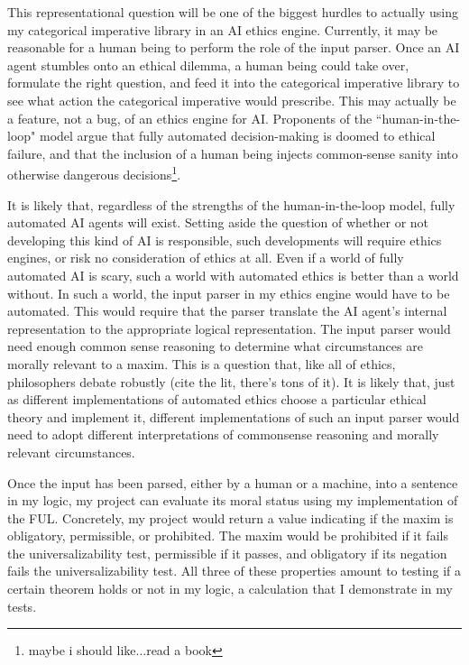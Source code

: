 \begin{isabellebody}
\begin{isamarkuptext}
This representational
question will be one of the biggest hurdles to actually using my categorical imperative library 
in an AI ethics engine. Currently, it may be reasonable for a human being to perform the role of the input
parser. Once an AI agent stumbles onto an ethical dilemma, a human being could take over, formulate 
the right question, and feed it into the categorical imperative library to see what action the categorical 
imperative would prescribe. This may actually be a feature, not a bug, of an ethics engine for AI. 
Proponents of the ``human-in-the-loop" model argue that fully automated decision-making is doomed 
to ethical failure, and that the inclusion of a human being injects common-sense sanity into otherwise 
dangerous decisions\footnote{maybe i should like...read a book}. 

It is likely that, regardless of the strengths of the human-in-the-loop model, fully automated AI 
agents will exist. Setting aside the question of whether or not developing this kind of AI is responsible,
such developments will require ethics engines, or risk no consideration of ethics at all. Even if a 
world of fully automated AI is scary, such a world with automated ethics is better than a world without. 
In such a world, the input parser in my ethics engine would have to be automated. This would require 
that the parser translate the AI agent's internal representation to the appropriate logical representation.
The input parser would need enough common sense reasoning to determine what circumstances are morally 
relevant to a maxim. This is a question that, like all of ethics, philosophers debate robustly (cite the lit,
there's tons of it). It is likely that, just as different implementations of automated ethics choose 
a particular ethical theory and implement it, different implementations of such an input parser would 
need to adopt different interpretations of commonsense reasoning and morally relevant circumstances.

Once the input has been parsed, either by a human or a machine, into  a sentence in my logic, my 
project can evaluate its moral status using my implementation of 
the FUL. Concretely, my project would return a value indicating if the maxim is obligatory, permissible, 
or prohibited. The maxim would be prohibited if it fails the universalizability test, permissible if it passes, and obligatory 
if its negation fails the universalizability test. All three of these properties amount to testing if a 
certain theorem holds or not in my logic, a calculation that I demonstrate in my tests. 


\end{isamarkuptext}
\end{isabellebody}

